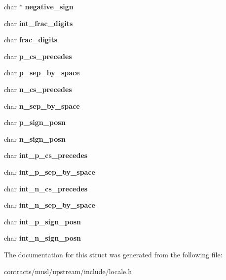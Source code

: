 \begin{DoxyCompactItemize}
char $\ast$ {\bfseries negative\+\_\+sign}
\item 
\mbox{\label{structlconv_a6b652f28cafc3092258b47c8099fe905}} 
char {\bfseries int\+\_\+frac\+\_\+digits}
\item 
\mbox{\label{structlconv_aa16e32ff4dcc95445742b5b165ffb071}} 
char {\bfseries frac\+\_\+digits}
\item 
\mbox{\label{structlconv_af0651922c77fc926609bdd8746784e63}} 
char {\bfseries p\+\_\+cs\+\_\+precedes}
\item 
\mbox{\label{structlconv_a3ae3cb36f4426158e4ab2ea6dc4278ad}} 
char {\bfseries p\+\_\+sep\+\_\+by\+\_\+space}
\item 
\mbox{\label{structlconv_ad118b68a229527f7e96538ac875169ad}} 
char {\bfseries n\+\_\+cs\+\_\+precedes}
\item 
\mbox{\label{structlconv_ab7ac20ce034900155183b32fc3c6d9a3}} 
char {\bfseries n\+\_\+sep\+\_\+by\+\_\+space}
\item 
\mbox{\label{structlconv_a1fdead36abe5c2ca673142ea401478e8}} 
char {\bfseries p\+\_\+sign\+\_\+posn}
\item 
\mbox{\label{structlconv_ae0bbe6f545952daef5a8cbdd054a184e}} 
char {\bfseries n\+\_\+sign\+\_\+posn}
\item 
\mbox{\label{structlconv_a1a78cbc82f07601c2acb643f8dffdf64}} 
char {\bfseries int\+\_\+p\+\_\+cs\+\_\+precedes}
\item 
\mbox{\label{structlconv_ae77e798ef92e86d58100b16fb8163443}} 
char {\bfseries int\+\_\+p\+\_\+sep\+\_\+by\+\_\+space}
\item 
\mbox{\label{structlconv_a36121c68c5571e40145365dd1edecbb7}} 
char {\bfseries int\+\_\+n\+\_\+cs\+\_\+precedes}
\item 
\mbox{\label{structlconv_ad9cfa63e25f4a2aa02f6c7ca540177a2}} 
char {\bfseries int\+\_\+n\+\_\+sep\+\_\+by\+\_\+space}
\item 
\mbox{\label{structlconv_a266ed42f4bb087d1efac551940c42f6f}} 
char {\bfseries int\+\_\+p\+\_\+sign\+\_\+posn}
\item 
\mbox{\label{structlconv_a642a9096f724fad40fe9f1711e92b323}} 
char {\bfseries int\+\_\+n\+\_\+sign\+\_\+posn}
\end{DoxyCompactItemize}


The documentation for this struct was generated from the following file\+:\begin{DoxyCompactItemize}
\item 
contracts/musl/upstream/include/locale.\+h\end{DoxyCompactItemize}
